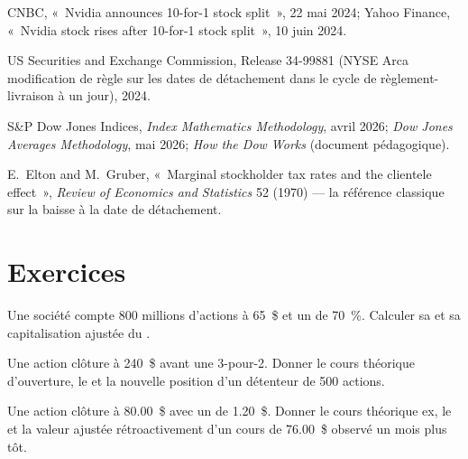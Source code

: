 \begin{omsources}
\item CNBC, «~Nvidia announces 10-for-1 stock split~», 22 mai 2024; Yahoo
Finance, «~Nvidia stock rises after 10-for-1 stock split~», 10 juin 2024.
\item US Securities and Exchange Commission, Release 34-99881 (NYSE Arca
modification de règle sur les dates de détachement dans le cycle de règlement-livraison à un jour), 2024.
\item S\&P Dow Jones Indices, \emph{Index Mathematics Methodology}, avril
2026; \emph{Dow Jones Averages Methodology}, mai 2026; \emph{How the Dow
Works} (document pédagogique).
\item E.~Elton and M.~Gruber, «~Marginal stockholder tax rates and the
clientele effect~», \emph{Review of Economics and Statistics} 52 (1970) ---
la référence classique sur la baisse à la date de détachement.
\end{omsources}

\section{Exercices}

\begin{exercise}[$\star$]\label{exo:m1:shares-corporate-actions-indices:1}
Une société compte 800 millions d'actions à 65~\$ et un  de 70~\%. Calculer sa
 et sa capitalisation ajustée du .
\end{exercise}

\begin{exercise}[$\star$]\label{exo:m1:shares-corporate-actions-indices:2}
Une action clôture à 240~\$ avant une  3-pour-2. Donner le cours
théorique d'ouverture, le  et la nouvelle position d'un détenteur de 500
actions.
\end{exercise}

\begin{exercise}[$\star$]\label{exo:m1:shares-corporate-actions-indices:3}
Une action clôture  à 80.00~\$ avec un  de 1.20~\$. Donner le
cours théorique ex, le  et la valeur ajustée rétroactivement d'un cours de
76.00~\$ observé un mois plus tôt.
\end{exercise}

